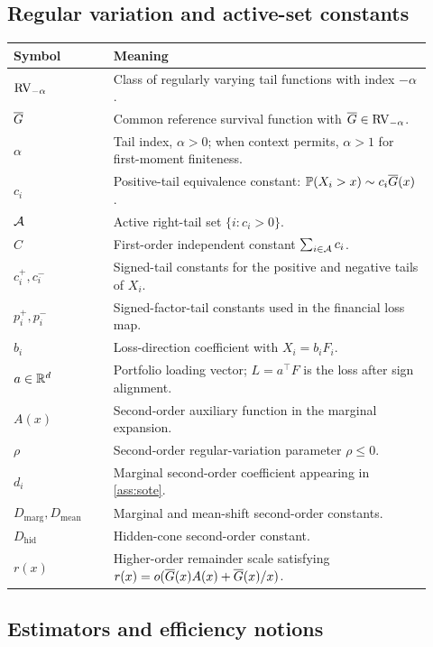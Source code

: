 \subsection{Regular variation and active-set constants}

\begin{longtable}{p{0.22\linewidth}p{0.70\linewidth}}
\toprule
Symbol & Meaning \\
\midrule
\endhead
\(\mathrm{RV}_{-\alpha}\) & Class of regularly varying tail functions with index \(-\alpha\). \\
\(\overline{G}\) & Common reference survival function with \(\overline{G}\in\mathrm{RV}_{-\alpha}\). \\
\(\alpha\) & Tail index, \(\alpha>0\); when context permits, \(\alpha>1\) for first-moment finiteness. \\
\(c_i\) & Positive-tail equivalence constant: \(\mathbb{P}(X_i>x)\sim c_i\overline{G}(x)\). \\
\(\mathcal{A}\) & Active right-tail set \(\{i:c_i>0\}\). \\
\(C\) & First-order independent constant \(\sum_{i\in\mathcal{A}}c_i\). \\
\(c_i^+,c_i^-\) & Signed-tail constants for the positive and negative tails of \(X_i\). \\
\(p_i^+,p_i^-\) & Signed-factor-tail constants used in the financial loss map. \\
\(b_i\) & Loss-direction coefficient with \(X_i=b_iF_i\). \\
\(a\in\mathbb{R}^d\) & Portfolio loading vector; \(L=a^\top F\) is the loss after sign alignment. \\
\(A(x)\) & Second-order auxiliary function in the marginal expansion. \\
\(\rho\) & Second-order regular-variation parameter \(\rho\le 0\). \\
\(d_i\) & Marginal second-order coefficient appearing in \cref{ass:sote}. \\
\(D_{\mathrm{marg}},D_{\mathrm{mean}}\) & Marginal and mean-shift second-order constants. \\
\(D_{\mathrm{hid}}\) & Hidden-cone second-order constant. \\
\(r(x)\) & Higher-order remainder scale satisfying \(r(x)=o(\overline{G}(x)A(x)+\overline{G}(x)/x)\). \\
\bottomrule
\end{longtable}

\subsection{Estimators and efficiency notions}

